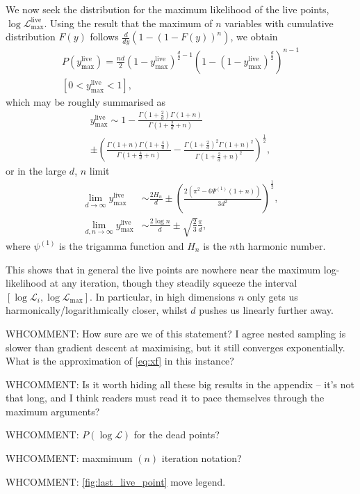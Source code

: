 \documentclass[usenatbib]{mnras}
\begin{document}
We now seek the distribution for the maximum likelihood of the live points, $\log\mathcal{L}_\mathrm{max}^{\mathrm{live}}$. Using the result that the maximum of $n$ variables with cumulative distribution $F(y)$ follows $\frac{d}{dy}( 1- (1-F(y))^n)$, we obtain
\begin{multline}
    P(y_\mathrm{max}^\mathrm{live}) = \frac{nd}{2}(1-y_\mathrm{max}^\mathrm{live})^{\frac{d}{2}-1}\left(1-(1-y_\mathrm{max}^\mathrm{live})^{\frac{d}{2}}\right)^{n-1}\\ 
    [0<y_\mathrm{max}^\mathrm{live}<1],
    \label{eq:Pyhat}
\end{multline}
which may be roughly summarised as
\begin{multline}
    y_\mathrm{max}^\mathrm{live} \sim 1-\frac{\Gamma(1+\frac{2}{d})\Gamma(1+n)}{\Gamma(1+\frac{2}{d}+n)} \\
     \pm \left( \frac{\Gamma(1+n)\Gamma(1+\frac{4}{d})}{\Gamma(1+\frac{4}{d}+n)} - \frac{\Gamma(1+\frac{2}{d})^2 \Gamma(1+n)^2}{\Gamma(1+\frac{2}{d}+n)^2}\right)^{\frac{1}{2}},
    \label{eq:ymax}
\end{multline}
or in the large $d$, $n$ limit
\begin{align}
    \lim_{d\to\infty} y_\mathrm{max}^\mathrm{live} &\sim \frac{2H_n}{d} \pm \left(\frac{2(\pi^2 - 6\Psi^{(1)}(1+n))}{3d^2}\right)^{\frac{1}{2}},
    \label{eq:ymaxd}\\
    \lim_{d,n\to\infty} y_\mathrm{max}^\mathrm{live} &\sim \frac{2\log n}{d} \pm \sqrt{\frac{2}{3}}\frac{\pi}{d},
    \label{eq:ymaxdn}
\end{align}
where $\psi^{(1)}$ is the trigamma function and $H_n$ is the $n$th harmonic number.
\par
This shows that in general the live points are nowhere near the maximum log-likelihood at any iteration, though they steadily squeeze the interval $[\log\mathcal{L}_i,\log\mathcal{L}_\mathrm{max}]$. In particular, in high dimensions $n$ only gets us harmonically/logarithmically closer, whilst $d$ pushes us linearly further away.

WHCOMMENT: How sure are we of this statement? I agree nested sampling is slower than gradient descent at maximising, but it still converges exponentially. What is the approximation of \cref{eq:xf} in this instance?

WHCOMMENT: Is it worth hiding all these big results in the appendix -- it's not that long, and I think readers must read it to pace themselves through the maximum arguments?

WHCOMMENT: $P(\log\mathcal{L})$ for the dead points?

WHCOMMENT: maxmimum $(n)$ iteration notation?

WHCOMMENT: \cref{fig:last_live_point} move legend.




\label{lastpage}
\end{document}
